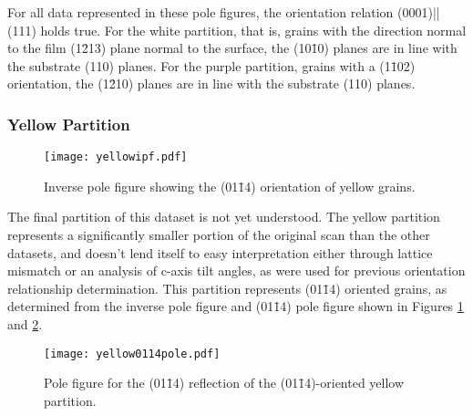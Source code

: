 For all data represented in these pole figures, the orientation relation (0001)||(111) holds true. For the white partition, that is, grains with the direction normal to the film (1\={2}13) plane normal to the surface, the (10\={1}0) planes are in line with the substrate (110) planes. For the purple partition, grains with a (1\={1}02) orientation, the (1\={2}10) planes are in line with the substrate (110) planes. 


\subsubsection{Yellow Partition}
\label{subsubsec:single.growth.yellow}

\begin{figure}
\centering
\texttt{[image: yellowipf.pdf]}
\caption[Inverse pole figure showing orientation of  yellow grains]{%
Inverse pole figure showing the (01\={1}4) orientation of yellow grains.}
\label{fig:yellowipf}

\end{figure}
The final partition of this dataset is not yet understood. The yellow partition represents a significantly smaller portion of the original scan than the other datasets, and doesn't lend itself to easy interpretation either through lattice mismatch or an analysis of c-axis tilt angles, as were used for previous orientation relationship determination. This partition represents (01\={1}4) oriented grains, as determined from the inverse pole figure and (01\={1}4) pole figure shown in Figures \ref{fig:yellowipf} and \ref{fig:yellow0114pole}.

\begin{figure}
\begin{center}
\texttt{[image: yellow0114pole.pdf]}
\caption[(01\={1}4) pole figure for yellow grains]{%
	Pole figure for the (01\={1}4) reflection of the (01\={1}4)-oriented yellow partition.}
\label{fig:yellow0114pole}
\end{center}
\end{figure}
			
